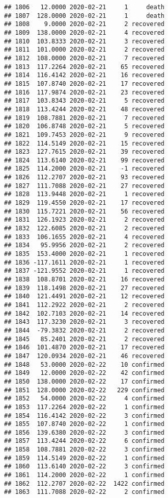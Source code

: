 \documentclass[
]{article}
\begin{document}
\begin{verbatim}
## 1806   12.0000 2020-02-21     1     death
## 1807  128.0000 2020-02-21     1     death
## 1808    9.0000 2020-02-21     2 recovered
## 1809  138.0000 2020-02-21     4 recovered
## 1810  103.8333 2020-02-21     3 recovered
## 1811  101.0000 2020-02-21     2 recovered
## 1812  108.0000 2020-02-21     7 recovered
## 1813  117.2264 2020-02-21    65 recovered
## 1814  116.4142 2020-02-21    16 recovered
## 1815  107.8740 2020-02-21    17 recovered
## 1816  117.9874 2020-02-21    23 recovered
## 1817  103.8343 2020-02-21     5 recovered
## 1818  113.4244 2020-02-21    48 recovered
## 1819  108.7881 2020-02-21     7 recovered
## 1820  106.8748 2020-02-21     5 recovered
## 1821  109.7453 2020-02-21     9 recovered
## 1822  114.5149 2020-02-21    15 recovered
## 1823  127.7615 2020-02-21    39 recovered
## 1824  113.6140 2020-02-21    99 recovered
## 1825  114.2000 2020-02-21    -1 recovered
## 1826  112.2707 2020-02-21    93 recovered
## 1827  111.7088 2020-02-21    27 recovered
## 1828  113.9448 2020-02-21     1 recovered
## 1829  119.4550 2020-02-21    17 recovered
## 1830  115.7221 2020-02-21    56 recovered
## 1831  126.1923 2020-02-21     2 recovered
## 1832  122.6085 2020-02-21     2 recovered
## 1833  106.1655 2020-02-21     4 recovered
## 1834   95.9956 2020-02-21     2 recovered
## 1835  153.4000 2020-02-21     1 recovered
## 1836 -117.1611 2020-02-21     1 recovered
## 1837 -121.9552 2020-02-21     1 recovered
## 1838  108.8701 2020-02-21    16 recovered
## 1839  118.1498 2020-02-21    27 recovered
## 1840  121.4491 2020-02-21    12 recovered
## 1841  112.2922 2020-02-21     2 recovered
## 1842  102.7103 2020-02-21    14 recovered
## 1843  117.3230 2020-02-21     3 recovered
## 1844  -79.3832 2020-02-21     2 recovered
## 1845   85.2401 2020-02-21     2 recovered
## 1846  101.4870 2020-02-21    17 recovered
## 1847  120.0934 2020-02-21    46 recovered
## 1848   53.0000 2020-02-22    10 confirmed
## 1849   12.0000 2020-02-22    42 confirmed
## 1850  138.0000 2020-02-22    17 confirmed
## 1851  128.0000 2020-02-22   229 confirmed
## 1852   54.0000 2020-02-22     4 confirmed
## 1853  117.2264 2020-02-22     1 confirmed
## 1854  116.4142 2020-02-22     3 confirmed
## 1855  107.8740 2020-02-22     1 confirmed
## 1856  139.6380 2020-02-22     3 confirmed
## 1857  113.4244 2020-02-22     6 confirmed
## 1858  108.7881 2020-02-22     3 confirmed
## 1859  114.5149 2020-02-22     1 confirmed
## 1860  113.6140 2020-02-22     3 confirmed
## 1861  114.2000 2020-02-22     1 confirmed
## 1862  112.2707 2020-02-22  1422 confirmed
## 1863  111.7088 2020-02-22     2 confirmed

\end{verbatim}
\end{document}
